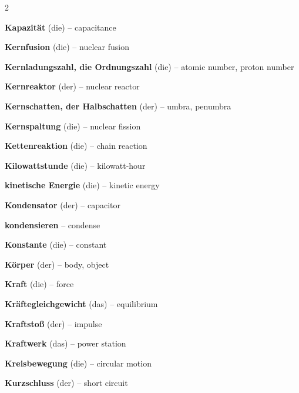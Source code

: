 \begin{multicols}{2}
\par\nopagebreak
\textbf{Kapazität} (die) -- capacitance\dotfill\hyperref[e:170]{\pageref*{e:170}}\par
\textbf{Kernfusion} (die) -- nuclear fusion\dotfill\hyperref[e:286]{\pageref*{e:286}}\par
\textbf{Kernladungszahl, die Ordnungszahl} (die) -- atomic number, proton number\dotfill\hyperref[e:267]{\pageref*{e:267}}\par
\textbf{Kernreaktor} (der) -- nuclear reactor\dotfill\hyperref[e:288]{\pageref*{e:288}}\par
\textbf{Kernschatten, der Halbschatten} (der) -- umbra, penumbra\dotfill\hyperref[e:226]{\pageref*{e:226}}\par
\textbf{Kernspaltung} (die) -- nuclear fission\dotfill\hyperref[e:285]{\pageref*{e:285}}\par
\textbf{Kettenreaktion} (die) -- chain reaction\dotfill\hyperref[e:287]{\pageref*{e:287}}\par
\textbf{Kilowattstunde} (die) -- kilowatt-hour\dotfill\hyperref[e:112]{\pageref*{e:112}}\par
\textbf{kinetische Energie} (die) -- kinetic energy\dotfill\hyperref[e:98]{\pageref*{e:98}}\par
\textbf{Kondensator} (der) -- capacitor\dotfill\hyperref[e:169]{\pageref*{e:169}}\par
\textbf{kondensieren} -- condense\dotfill\hyperref[e:133]{\pageref*{e:133}}\par
\textbf{Konstante} (die) -- constant\dotfill\hyperref[e:27]{\pageref*{e:27}}\par
\textbf{Körper} (der) -- body, object\dotfill\hyperref[e:28]{\pageref*{e:28}}\par
\textbf{Kraft} (die) -- force\dotfill\hyperref[e:59]{\pageref*{e:59}}\par
\textbf{Kräftegleichgewicht} (das) -- equilibrium\dotfill\hyperref[e:75]{\pageref*{e:75}}\par
\textbf{Kraftstoß} (der) -- impulse\dotfill\hyperref[e:80]{\pageref*{e:80}}\par
\textbf{Kraftwerk} (das) -- power station\dotfill\hyperref[e:111]{\pageref*{e:111}}\par
\textbf{Kreisbewegung} (die) -- circular motion\dotfill\hyperref[e:50]{\pageref*{e:50}}\par
\textbf{Kurzschluss} (der) -- short circuit\dotfill\hyperref[e:164]{\pageref*{e:164}}\par


\end{multicols}
